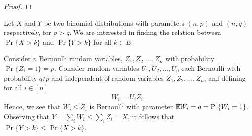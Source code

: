 \documentclass[a4paper,10pt,english]{article}
\begin{document}
\begin{proof}
\end{proof}
\begin{shaded*}
Let $X$ and $Y$ be two binomial distributions with parameters $(n,p)$ and $(n,q)$ respectively, for $p > q$. 
We are interested in finding the relation between $\Pr\{X > k\}$ and $\Pr\{Y > k\}$  for all $k \in E$. 

Consider $n$ Bernoulli random variables, $Z_1,Z_2, \ldots,Z_n$ with probability $\Pr\{Z_i = 1\} = p$. 
Consider random variables $U_1, U_2, \ldots, U_n$ each Bernoulli with probability $q/p$ and independent of random variables $Z_1,Z_2, \ldots, Z_n$, and defining for all $i \in [n]$
\begin{align*}
W_i = U_iZ_i.
\end{align*}
Hence, we see that $W_i \leq Z_i$ is Bernoulli with parameter $\mathbb{E} W_i = q = \Pr\{W_i = 1\}$.
Observing that $Y = \sum_i W_i \leq \sum_i Z_i  = X$, it follows that $\Pr\{Y > k\} \leq  \Pr\{X > k\}$. 
\end{shaded*}
 
\end{document}
